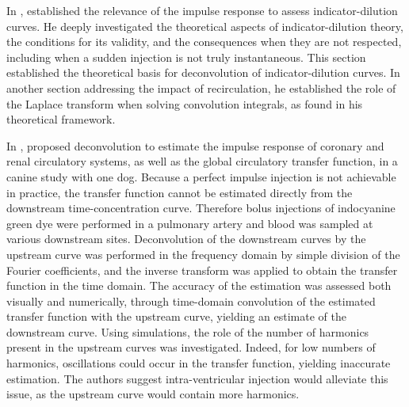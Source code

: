 In \citeyear{Zierler:1962cx}, \citet{Zierler:1962cx} established the relevance of the impulse response to assess indicator-dilution curves.
He deeply investigated the theoretical aspects of indicator-dilution theory, the conditions for its validity, and the consequences when they are not respected, including when a sudden injection is not truly instantaneous. 
This section established the theoretical basis for deconvolution of indicator-dilution curves. 
In another section addressing the impact of recirculation, he established the role of the Laplace transform when solving convolution integrals, as found in his theoretical framework.

In \citeyear{Coulam:1966un}, \citet{Coulam:1966un} proposed deconvolution to estimate the impulse response of coronary and renal circulatory systems, as well as the global circulatory transfer function, in a canine study with one dog.
Because a perfect impulse injection is not achievable in practice, the transfer function cannot be estimated directly from the downstream time-concentration curve.
Therefore bolus injections of indocyanine green dye were performed in a pulmonary artery and blood was sampled at various downstream sites.
Deconvolution of the downstream curves by the upstream curve was performed in the frequency domain by simple division of the Fourier coefficients, and the inverse transform was applied to obtain the transfer function in the time domain.
The accuracy of the estimation was assessed both visually and numerically, through time-domain convolution of the estimated transfer function with the upstream curve, yielding an estimate of the downstream curve. 
Using simulations, the role of the number of harmonics present in the upstream curves was investigated.
Indeed, for low numbers of harmonics, oscillations could occur in the transfer function, yielding inaccurate estimation.
The authors suggest intra-ventricular injection would alleviate this issue, as the upstream curve would contain more harmonics.


